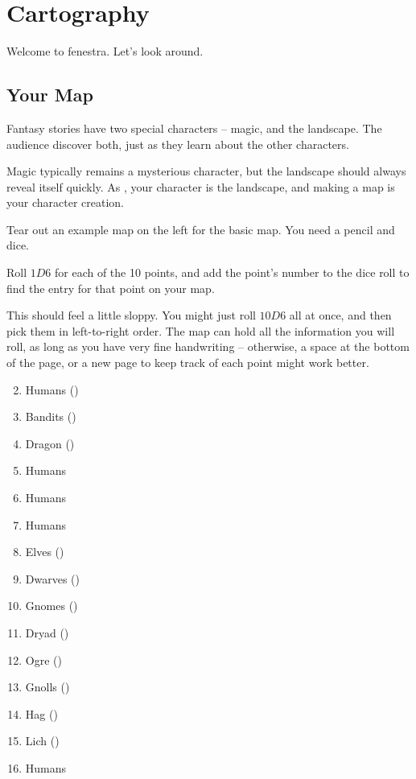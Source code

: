 \chapter[The Cartographers]{Cartography}
\label{civilization}

Welcome to \gls{fenestra}.
Let's look around.

\section{Your Map}
\label{yourMap}

\begin{multicols}{2}

\noindent
Fantasy stories have two special characters -- magic, and the landscape.
The audience discover both, just as they learn about the other characters.

Magic typically remains a mysterious character, but the landscape should always reveal itself quickly.
As , your character is the landscape, and making a map is your character creation.


Tear out an example map on the left for the basic map.
You need a pencil and dice.

Roll $1D6$ for each of the 10 points, and add the point's number to the dice roll to find the entry for that point on your map.

This should feel a little sloppy.
You might just roll $10D6$ all at once, and then pick them in left-to-right order.
The map can hold all the information you will roll, as long as you have very fine handwriting -- otherwise, a space at the bottom of the page, or a new page to keep track of each point might work better.

\begin{multicols}{2}

\begin{enumerate}
  \setcounter{enumi}{1}
  \item
  Humans
  ()
  \item
  Bandits
  ()
  \item
  Dragon
  ()
  \item
  Humans
  \item
  Humans
  \item
  Humans
  \item
  Elves
  ()
  \item
  Dwarves
  ()
  \item
  Gnomes
  ()
  \item
  Dryad
  ()
  \item
  Ogre
  ()
  \item
  Gnolls
  ()
  \item
  Hag
  ()
  \item
  Lich
  ()
  \item
  Humans
\end{enumerate}


\end{multicols}
\end{multicols}
